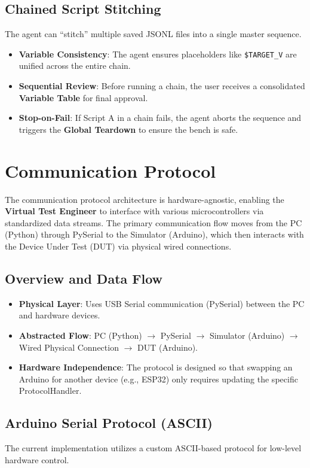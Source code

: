 \documentclass[conference]{IEEEtran}
\begin{document}
\subsection{Chained Script Stitching}
The agent can ``stitch'' multiple saved JSONL files into a single master sequence.
\begin{itemize}
    \item \textbf{Variable Consistency}: The agent ensures placeholders like \texttt{\$TARGET\_V} are unified across the entire chain.
    \item \textbf{Sequential Review}: Before running a chain, the user receives a consolidated \textbf{Variable Table} for final approval.
    \item \textbf{Stop-on-Fail}: If Script A in a chain fails, the agent aborts the sequence and triggers the \textbf{Global Teardown} to ensure the bench is safe.
\end{itemize}

\section{Communication Protocol}
The communication protocol architecture is hardware-agnostic, enabling the \textbf{Virtual Test Engineer} to interface with various microcontrollers via standardized data streams. The primary communication flow moves from the PC (Python) through PySerial to the Simulator (Arduino), which then interacts with the Device Under Test (DUT) via physical wired connections.

\subsection{Overview and Data Flow}
\begin{itemize}
    \item \textbf{Physical Layer}: Uses USB Serial communication (PySerial) between the PC and hardware devices.
    \item \textbf{Abstracted Flow}: PC (Python) $\rightarrow$ PySerial $\rightarrow$ Simulator (Arduino) $\rightarrow$ Wired Physical Connection $\rightarrow$ DUT (Arduino).
    \item \textbf{Hardware Independence}: The protocol is designed so that swapping an Arduino for another device (e.g., ESP32) only requires updating the specific ProtocolHandler.
\end{itemize}

\subsection{Arduino Serial Protocol (ASCII)}
The current implementation utilizes a custom ASCII-based protocol for low-level hardware control.
\end{document}
